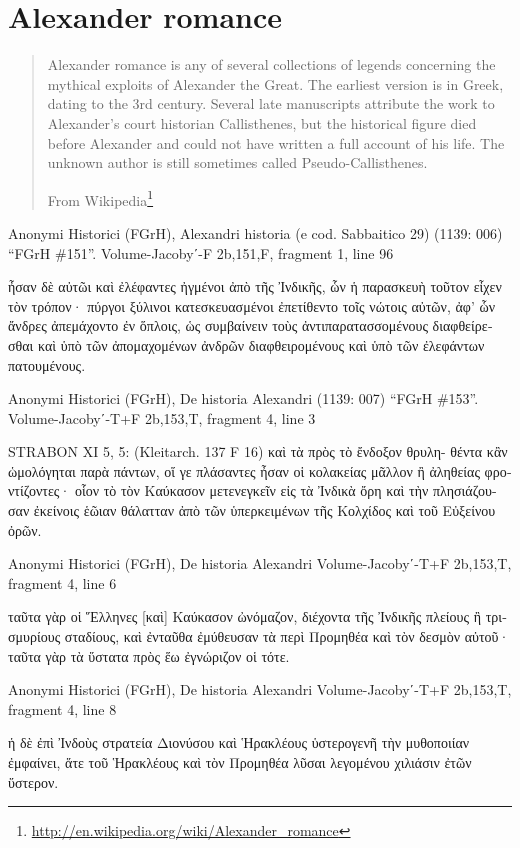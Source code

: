\documentclass[12pt,letterpaper,twoside,final]{memoir}
\begin{document}
\section{Alexander romance}
\blockquote[From Wikipedia\footnote{\url{http://en.wikipedia.org/wiki/Alexander_romance}}]{Alexander romance is any of several collections of legends concerning the mythical exploits of Alexander the Great. The earliest version is in Greek, dating to the 3rd century. Several late manuscripts attribute the work to Alexander's court historian Callisthenes, but the historical figure died before Alexander and could not have written a full account of his life. The unknown author is still sometimes called Pseudo-Callisthenes.}
\begin{greek}


Anonymi Historici (FGrH), Alexandri historia (e cod. Sabbaitico 29) (1139: 006)
“FGrH \#151”.
Volume-Jacobyʹ-F 2b,151,F, fragment 1, line 96

ἦσαν δὲ αὐτῶι καὶ ἐλέφαντες ἠγμένοι ἀπὸ τῆς Ἰνδικῆς, ὧν ἡ παρασκευὴ 
τοῦτον εἶχεν τὸν τρόπον· πύργοι ξύλινοι κατεσκευασμένοι ἐπετίθεντο 
τοῖς νώτοις αὐτῶν, ἀφ' ὧν ἄνδρες ἀπεμάχοντο ἐν ὅπλοις, ὡς συμβαίνειν 
τοὺς ἀντιπαρατασσομένους διαφθείρεσθαι καὶ ὑπὸ τῶν ἀπομαχομένων 
ἀνδρῶν διαφθειρομένους καὶ ὑπὸ τῶν ἐλεφάντων πατουμένους. 



Anonymi Historici (FGrH), De historia Alexandri (1139: 007)
“FGrH \#153”.
Volume-Jacobyʹ-T+F 2b,153,T, fragment 4, line 3

STRABON XI 5, 5: (Kleitarch. 137 F 16) καὶ τὰ πρὸς τὸ ἔνδοξον θρυλη-
θέντα κἂν ὡμολόγηται παρὰ πάντων, οἵ γε πλάσαντες ἦσαν οἱ κολακείας μᾶλλον ἢ 
ἀληθείας φροντίζοντες· οἷον τὸ τὸν Καύκασον μετενεγκεῖν εἰς τὰ Ἰνδικὰ ὄρη καὶ 
τὴν πλησιάζουσαν ἐκείνοις ἑῶιαν θάλατταν ἀπὸ τῶν ὑπερκειμένων τῆς Κολχίδος καὶ 
τοῦ Εὐξείνου ὀρῶν. 



Anonymi Historici (FGrH), De historia Alexandri 
Volume-Jacobyʹ-T+F 2b,153,T, fragment 4, line 6

                         ταῦτα γὰρ οἱ Ἕλληνες [καὶ] Καύκασον ὠνόμαζον, διέχοντα τῆς 
Ἰνδικῆς πλείους ἢ τρισμυρίους σταδίους, καὶ ἐνταῦθα ἐμύθευσαν τὰ περὶ Προμηθέα 
καὶ τὸν δεσμὸν αὐτοῦ· ταῦτα γὰρ τὰ ὕστατα πρὸς ἕω ἐγνώριζον οἱ τότε. 



Anonymi Historici (FGrH), De historia Alexandri 
Volume-Jacobyʹ-T+F 2b,153,T, fragment 4, line 8

                                                                                      ἡ δὲ ἐπὶ 
Ἰνδοὺς στρατεία Διονύσου καὶ Ἡρακλέους ὑστερογενῆ τὴν μυθοποιίαν ἐμφαίνει, ἅτε 
τοῦ Ἡρακλέους καὶ τὸν Προμηθέα λῦσαι λεγομένου χιλιάσιν ἐτῶν ὕστερον. 




\end{greek}
\end{document}
